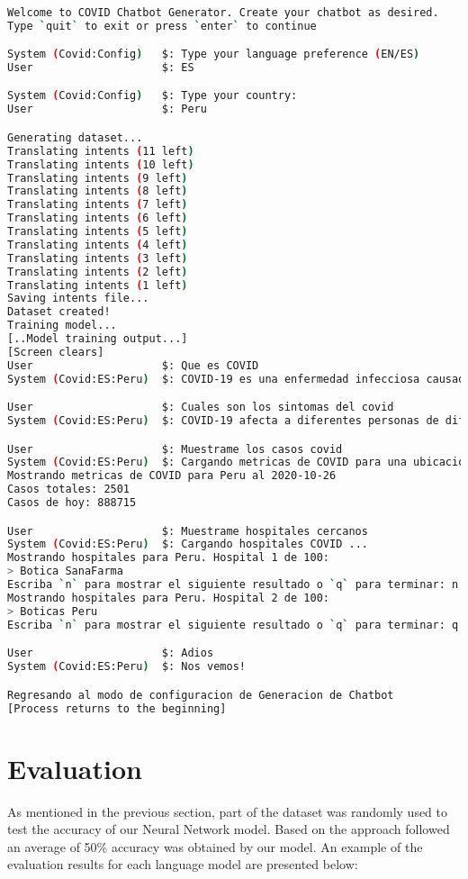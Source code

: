 \documentclass[]{article}
\begin{document}
\begin{lstlisting}[language=bash, caption=Spanish Chatbot Test Case, style=mybashcode]

Welcome to COVID Chatbot Generator. Create your chatbot as desired.
Type `quit` to exit or press `enter` to continue

System (Covid:Config)   $: Type your language preference (EN/ES)
User                    $: ES

System (Covid:Config)   $: Type your country:
User                    $: Peru

Generating dataset...
Translating intents (11 left)
Translating intents (10 left)
Translating intents (9 left)
Translating intents (8 left)
Translating intents (7 left)
Translating intents (6 left)
Translating intents (5 left)
Translating intents (4 left)
Translating intents (3 left)
Translating intents (2 left)
Translating intents (1 left)
Saving intents file...
Dataset created!
Training model...
[..Model training output...]
[Screen clears]
User                    $: Que es COVID
System (Covid:ES:Peru)  $: COVID-19 es una enfermedad infecciosa causada por el coronavirus 2 sindrome respiratorio agudo severo

User                    $: Cuales son los sintomas del covid
System (Covid:ES:Peru)  $: COVID-19 afecta a diferentes personas de diferentes maneras. Se ha informado de una amplia gama de sintomas de personas infectadas, desde sintomas leves hasta enfermedades graves.

User                    $: Muestrame los casos covid
System (Covid:ES:Peru)  $: Cargando metricas de COVID para una ubicacion especifica ...
Mostrando metricas de COVID para Peru al 2020-10-26
Casos totales: 2501
Casos de hoy: 888715

User                    $: Muestrame hospitales cercanos
System (Covid:ES:Peru)  $: Cargando hospitales COVID ...
Mostrando hospitales para Peru. Hospital 1 de 100:
> Botica SanaFarma
Escriba `n` para mostrar el siguiente resultado o `q` para terminar: n
Mostrando hospitales para Peru. Hospital 2 de 100:
> Boticas Peru
Escriba `n` para mostrar el siguiente resultado o `q` para terminar: q

User                    $: Adios
System (Covid:ES:Peru)  $: Nos vemos!

Regresando al modo de configuracion de Generacion de Chatbot
[Process returns to the beginning]
\end{lstlisting}

\section*{Evaluation}
As mentioned in the previous section, part of the dataset was randomly used to test the accuracy of our Neural Network model. Based on the approach followed an average of 50\% accuracy was obtained by our model. An example of the evaluation results for each language model are presented below:
\end{document}
